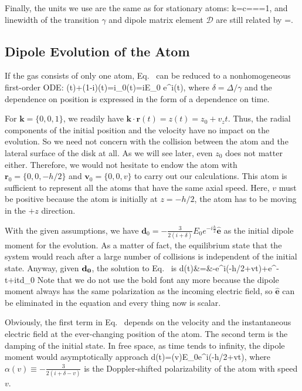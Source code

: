 Finally, the units we use are the same as for stationary atoms:
\bea
k=c=\hbar==1,
\eea 
and linewidth of the transition $\gamma$ and dipole matrix element $\mathcal{D}$ are still related by 
\bea
{}=.
\eea

\subsection{Dipole Evolution of the Atom}
If the gas consists of only one atom, Eq.~ can be reduced to a nonhomogeneous first-order ODE:
\bea
{}(t)+(1-i\delta)(t)=i_0(t)=iE_0\,\,e^{i\cdot{}(t)},
\label{SINGLEEQ}
\eea
where $\delta=\Delta/\gamma$ and the dependence on position is expressed in the form of a dependence on time. 

For $\mathbf{k}=\{0,0,1\}$, we readily have $\mathbf{k}\cdot\mathbf{r}(t)=z(t)=z_0+v_zt$. Thus, the radial components of the initial position and the velocity have no impact on the evolution. So we need not concern with the collision between the atom and the lateral surface of the disk at all. As we will see later, even $z_0$ does not matter either. Therefore, we would not hesitate to endow the atom with $\mathbf{r}_0=\{0,0,-h/2\}$ and $\mathbf{v}_0=\{0,0,v\}$ to carry out our calculations. This atom is sufficient to represent all the atoms that have the same axial speed. Here, $v$ must be positive because the atom is initially at $z=-h/2$, the atom has to be moving in the $+z$ direction.

With the given assumptions, we have $\mathbf{d}_0=-\frac{3}{2(i+\delta)}E_0e^{-i\frac{h}{2}}\hat{\mathbf{e}}$ as the initial dipole moment for the evolution. As a matter of fact, the equilibrium state that the system would reach after a large number of collisions is independent of the initial state. Anyway, given $\bf{d}_0$, the solution to Eq.~ is
\bea
d(t)&=&-e^{i(-h/2+vt)}+e^{-t+i\delta t}d_0
\label{SINGLESOL}
\eea
Note that we do not use the bold font any more because the dipole moment always has the same polarization as the incoming electric field, so $\hat{\mathbf{e}}$ can be eliminated in the equation and every thing now is scalar.

Obviously, the first term in Eq.~ depends on the velocity and the instantaneous electric field at the ever-changing position of the atom. The second term is the damping of the initial state. In free space, as time tends to infinity, the dipole moment would asymptotically approach
\bea
d(t\to\infty)=\alpha(v)E_0e^{i(-h/2+vt)},
\eea
where $\alpha(v)\equiv-\frac{3}{2(i+\delta-v)}$ is the Doppler-shifted polarizability of the atom with speed $v$.

